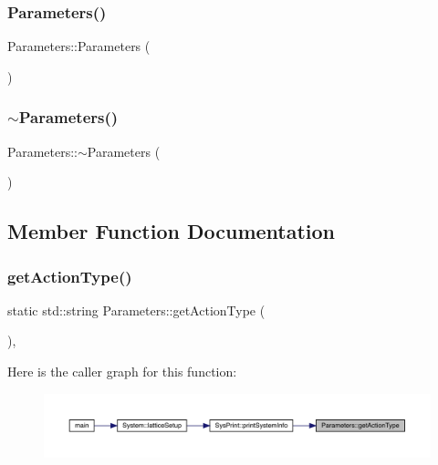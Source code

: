 \subsubsection{\texorpdfstring{Parameters()}{Parameters()}}
{\footnotesize\ttfamily Parameters\+::\+Parameters (\begin{DoxyParamCaption}{ }\end{DoxyParamCaption})}

\mbox{\label{class_parameters_a640a1a349975a8cb023696f25e563a5c}} 
\subsubsection{\texorpdfstring{$\sim$Parameters()}{~Parameters()}}
{\footnotesize\ttfamily Parameters\+::$\sim$\+Parameters (\begin{DoxyParamCaption}{ }\end{DoxyParamCaption})}



\subsection{Member Function Documentation}
\mbox{\label{class_parameters_afc824aec2ab48afe06829050d0fbe966}} 
\subsubsection{\texorpdfstring{getActionType()}{getActionType()}}
{\footnotesize\ttfamily static std\+::string Parameters\+::get\+Action\+Type (\begin{DoxyParamCaption}{ }\end{DoxyParamCaption})\hspace{0.3cm}{\ttfamily [inline]}, {\ttfamily [static]}}

Here is the caller graph for this function\+:
\nopagebreak
\begin{figure}[H]
\begin{center}
\leavevmode
\includegraphics[width=350pt]{class_parameters_afc824aec2ab48afe06829050d0fbe966_icgraph}
\end{center}
\end{figure}
\mbox{\label{class_parameters_a181a773d23fdb19d0c4f35e6cf2d5649}} 
